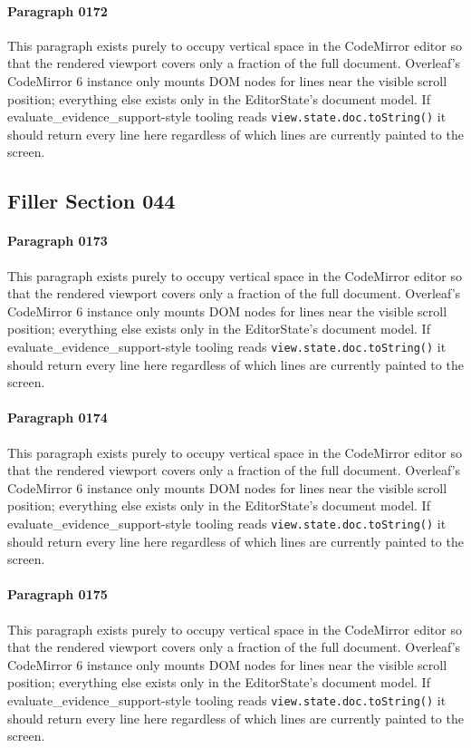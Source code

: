 \documentclass{article}
\begin{document}
\paragraph{Paragraph 0172}
This paragraph exists purely to occupy vertical space in the CodeMirror editor so that the rendered viewport covers only a fraction of the full document. Overleaf's CodeMirror 6 instance only mounts DOM nodes for lines near the visible scroll position; everything else exists only in the EditorState's document model. If evaluate\_evidence\_support-style tooling reads \texttt{view.state.doc.toString()} it should return every line here regardless of which lines are currently painted to the screen.

\subsection{Filler Section 044}
\paragraph{Paragraph 0173}
This paragraph exists purely to occupy vertical space in the CodeMirror editor so that the rendered viewport covers only a fraction of the full document. Overleaf's CodeMirror 6 instance only mounts DOM nodes for lines near the visible scroll position; everything else exists only in the EditorState's document model. If evaluate\_evidence\_support-style tooling reads \texttt{view.state.doc.toString()} it should return every line here regardless of which lines are currently painted to the screen.

\paragraph{Paragraph 0174}
This paragraph exists purely to occupy vertical space in the CodeMirror editor so that the rendered viewport covers only a fraction of the full document. Overleaf's CodeMirror 6 instance only mounts DOM nodes for lines near the visible scroll position; everything else exists only in the EditorState's document model. If evaluate\_evidence\_support-style tooling reads \texttt{view.state.doc.toString()} it should return every line here regardless of which lines are currently painted to the screen.

\paragraph{Paragraph 0175}
This paragraph exists purely to occupy vertical space in the CodeMirror editor so that the rendered viewport covers only a fraction of the full document. Overleaf's CodeMirror 6 instance only mounts DOM nodes for lines near the visible scroll position; everything else exists only in the EditorState's document model. If evaluate\_evidence\_support-style tooling reads \texttt{view.state.doc.toString()} it should return every line here regardless of which lines are currently painted to the screen.
\end{document}
